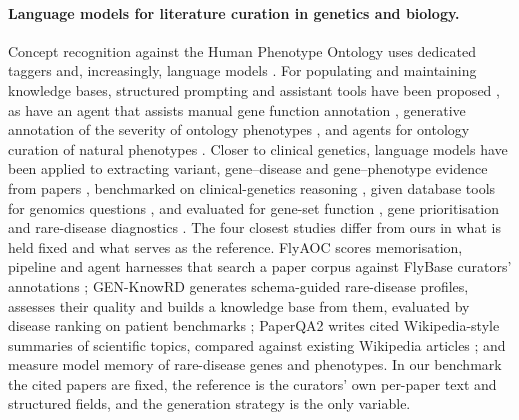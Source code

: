 \documentclass{article} %
\begin{document}
\paragraph{Language models for literature curation in genetics and biology.}
Concept recognition against the Human Phenotype Ontology uses dedicated taggers \citep{luo2021phenotagger,groza2024fasthpocr} and, increasingly, language models \citep{groza2024evaluation,yang2024enhancing,garcia2025improving}. For populating and maintaining knowledge bases, structured prompting and assistant tools have been proposed \citep{caufield2024structured,caufield2024curategpt,toro2024dynamic,niyonkuru2025leveraging}, as have an agent that assists manual gene function annotation \citep{Li2025GenewhispererEnhancing}, generative annotation of the severity of ontology phenotypes \citep{Murphy2024HarnessingGenerative}, and agents for ontology curation of natural phenotypes \citep{balhoff2026frontier}. Closer to clinical genetics, language models have been applied to extracting variant, gene--disease and gene--phenotype evidence from papers \citep{li2025autopm3,furlan2025eagleai,wang2026pubmind,yin2026benchmarking}, benchmarked on clinical-genetics reasoning \citep{queen2025cgbench}, given database tools for genomics questions \citep{Jin2023GenegptAugmenting}, and evaluated for gene-set function \citep{hu2025evaluation}, gene prioritisation \citep{Kim2024AssessingUtility} and rare-disease diagnostics \citep{twede2026evidence}. The four closest studies differ from ours in what is held fixed and what serves as the reference. FlyAOC scores memorisation, pipeline and agent harnesses that search a paper corpus against FlyBase curators' annotations \citep{zhang2026flyaoc}; GEN-KnowRD generates schema-guided rare-disease profiles, assesses their quality and builds a knowledge base from them, evaluated by disease ranking on patient benchmarks \citep{yan2026genknowrd}; PaperQA2 writes cited Wikipedia-style summaries of scientific topics, compared against existing Wikipedia articles \citep{skarlinski2024language}; and \citet{groza2026systematic} measure model memory of rare-disease genes and phenotypes. In our benchmark the cited papers are fixed, the reference is the curators' own per-paper text and structured fields, and the generation strategy is the only variable.
\end{document}
